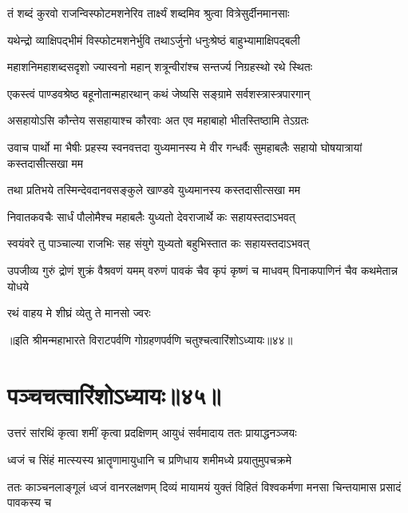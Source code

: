 \twolineshloka
{तं शब्दं कुरवो राजन्विस्फोटमशनेरिव}
{तार्क्ष्यं शब्दमिव श्रुत्वा वित्रेसुर्दीनमानसाः}


\twolineshloka
{यथेन्द्रो व्याक्षिपद्भीमं विस्फोटमशनेर्भुवि}
{तथाऽर्जुनो धनुःश्रेष्ठं बाहुभ्यामाक्षिपद्बली}


\twolineshloka
{महाशनिमहाशब्दसदृशो ज्यास्वनो महान्}
{शत्रून्वीरांश्च सन्तर्ज्य निग्रहस्थो रथे स्थितः}




\twolineshloka
{एकस्त्वं पाण्डवश्रेष्ठ बहूनोतान्महारथान्}
{कथं जेष्यसि सङ्ग्रामे सर्वशस्त्रास्त्रपारगान्}


\twolineshloka
{असहायोऽसि कौन्तेय ससहायाश्च कौरवाः}
{अत एव महाबाहो भीतस्तिष्ठामि तेऽग्रतः}



\onelineshloka
{उवाच पार्थो मा भैषीः प्रहस्य स्वनवत्तदा}
\twolineshloka
{युध्यमानस्य मे वीर गन्धर्वैः सुमहाबलैः}
{सहायो घोषयात्रायां कस्तदासीत्सखा मम}


\twolineshloka
{तथा प्रतिभये तस्मिन्देवदानवसङ्कुले}
{खाण्डवे युध्यमानस्य कस्तदासीत्सखा मम}


\twolineshloka
{निवातकवचैः सार्धं पौलोमैश्च महाबलैः}
{युध्यतो देवराजार्थे कः सहायस्तदाऽभवत्}


\twolineshloka
{स्वयंवरे तु पाञ्चाल्या राजभिः सह संयुगे}
{युध्यतो बहुभिस्तात कः सहायस्तदाऽभवत्}


\threelineshloka
{उपजीव्य गुरुं द्रोणं शुक्रं वैश्रवणं यमम्}
{वरुणं पावकं चैव कृपं कृष्णं च माधवम्}
{पिनाकपाणिनं चैव कथमेतान्न योधये}


\onelineshloka
{रथं वाहय मे शीघ्रं व्येतु ते मानसो ज्वरः}


॥इति श्रीमन्महाभारते विराटपर्वणि गोग्रहणपर्वणि चतुश्चत्वारिंशोऽध्यायः॥४४॥

\chapter{पञ्चचत्वारिंशोऽध्यायः॥४५॥}

\twolineshloka
{उत्तरं सांरथिं कृत्वा शमीं कृत्वा प्रदक्षिणम्}
{आयुधं सर्वमादाय ततः प्रायाद्धनञ्जयः}


\twolineshloka
{ध्वजं च सिंहं मात्स्यस्य भ्रातॄणामायुधानि च}
{प्रणिधाय शमीमध्ये प्रयातुमुपचक्रमे}


\threelineshloka
{ततः काञ्चनलाङ्गूलं ध्वजं वानरलक्षणम्}
{दिव्यं मायामयं युक्तं विहितं विश्वकर्मणा}
{मनसा चिन्तयामास प्रसादं पावकस्य च}


